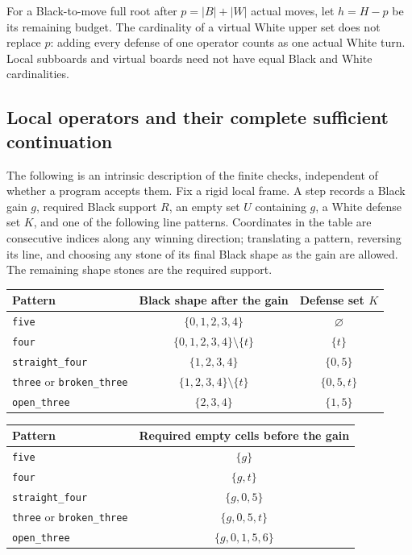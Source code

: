 \documentclass[11pt]{article}
\theoremstyle{definition}
\theoremstyle{remark}
\begin{document}
For a Black-to-move full root after $p=|B|+|W|$ actual moves, let $h=H-p$ be its remaining budget. The cardinality of a virtual White upper set does not replace $p$: adding every defense of one operator counts as one actual White turn. Local subboards and virtual boards need not have equal Black and White cardinalities.
\subsection{Local operators and their complete sufficient continuation}\label{mac:local-section}

The following is an intrinsic description of the finite checks, independent of whether a program accepts them. Fix a rigid local frame. A step records a Black gain \(g\), required Black support \(R\), an empty set \(U\) containing \(g\), a White defense set \(K\), and one of the following line patterns. Coordinates in the table are consecutive indices along any winning direction; translating a pattern, reversing its line, and choosing any stone of its final Black shape as the gain are allowed. The remaining shape stones are the required support.

\begin{center}
\small
\renewcommand{\arraystretch}{1.25}
\begin{tabular}{@{}lcc@{}}
\hline
Pattern & Black shape after the gain & Defense set $K$ \\
\hline
\texttt{five} & $\{0,1,2,3,4\}$ & $\varnothing$ \\
\texttt{four} & $\{0,1,2,3,4\}\setminus\{t\}$ & $\{t\}$ \\
\texttt{straight\_four} & $\{1,2,3,4\}$ & $\{0,5\}$ \\
\texttt{three} or \texttt{broken\_three} & $\{1,2,3,4\}\setminus\{t\}$ & $\{0,5,t\}$ \\
\texttt{open\_three} & $\{2,3,4\}$ & $\{1,5\}$ \\
\hline
\end{tabular}
\par\medskip
\begin{tabular}{@{}lc@{}}
\hline
Pattern & Required empty cells before the gain \\
\hline
\texttt{five} & $\{g\}$ \\
\texttt{four} & $\{g,t\}$ \\
\texttt{straight\_four} & $\{g,0,5\}$ \\
\texttt{three} or \texttt{broken\_three} & $\{g,0,5,t\}$ \\
\texttt{open\_three} & $\{g,0,1,5,6\}$ \\
\hline
\end{tabular}
\end{center}
\end{document}
